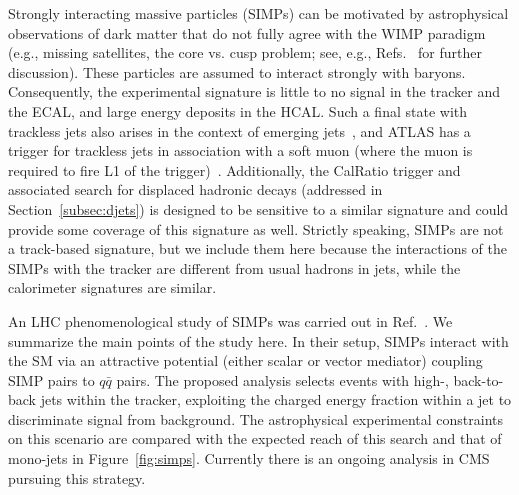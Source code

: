 Strongly interacting massive particles (SIMPs) can be motivated by astrophysical observations of dark matter that do not fully agree with the WIMP paradigm (e.g., missing satellites, the core vs. cusp problem; see, e.g., Refs.~\cite{2010arXiv1009.4505B,2011MNRAS.415L..40B,Weinberg:2013aya,1742-6596-437-1-012001} for further discussion). These particles are assumed to interact strongly with baryons. Consequently, the experimental signature is little to no signal in the tracker and the ECAL, and large energy deposits in the HCAL. Such a final state with trackless jets also arises in the context of emerging jets~\cite{Schwaller:2015gea}, and ATLAS has a trigger for trackless jets in association with a soft muon (where the muon is required to fire L1 of the trigger)~\cite{ATLASLLPTriggers}.
Additionally, the CalRatio trigger and associated search for displaced hadronic decays (addressed in Section~\ref{subsec:djets}) is designed to be sensitive to a similar signature and could provide some coverage of this signature as well. Strictly speaking, SIMPs are not a track-based signature, but we include them here because the interactions of the SIMPs with the tracker are different from usual hadrons in jets, while the calorimeter signatures are similar.

An LHC phenomenological study of SIMPs was carried out in Ref.~\cite{Daci:2015hca}. We summarize the main points of the study here. In their setup, SIMPs interact with the SM via an attractive potential (either scalar or vector mediator) coupling SIMP pairs to $q\bar{q}$ pairs. The proposed analysis selects events with high-\pT, back-to-back jets within the tracker, exploiting the charged energy fraction within a jet to discriminate signal from background. The astrophysical experimental constraints on this scenario are compared with the expected reach of this search and that of mono-jets in Figure~\ref{fig:simps}. Currently there is an ongoing analysis in CMS pursuing this strategy.

